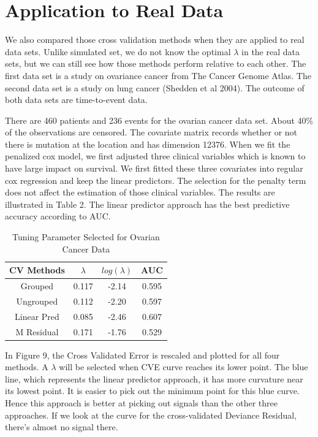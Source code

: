\documentclass{article}\usepackage[]{graphicx}\usepackage[]{color}
\begin{document}
    
    
\section{Application to Real Data}

We also compared those cross validation methods when they are applied to real data sets. Unlike simulated set, we do not know the optimal $\lambda$ in the real data sets, but we can still see how those methods perform relative to each other. The first data set is a study on ovariance cancer from The Cancer Genome Atlas. The second data set is a study on lung cancer (Shedden et al 2004). The outcome of both data sets are time-to-event data.

There are 460 patients and 236 events for the ovarian cancer data set. About 40$\%$ of the observations are censored. The covariate matrix records whether or not there is mutation at the location and has dimension 12376. When we fit the penalized cox model, we first adjusted three clinical variables which is known to have large impact on survival. We first fitted these three covariates into regular cox regression and keep the linear predictors. The selection for the penalty term does not affect the estimation of those clinical variables. The results are illustrated in Table 2. The linear predictor approach has the best predictive accuracy according to AUC. 

\begin{table}[h]
\centering
  \begin{tabular}{ c | c | c | c}
				CV Methods & $\lambda$ & $log(\lambda)$ &AUC \\
				\hline \hline
				Grouped  &  0.117 & -2.14 &   0.595\\
				Ungrouped &  0.112 & -2.20 &  0.597\\
				Linear Pred &  0.085 & -2.46 &     0.607\\
				M Residual & 0.171 & -1.76 & 0.529 
	\end{tabular}
  \caption{Tuning Parameter Selected for Ovarian Cancer Data}
\end{table}


In Figure 9, the Cross Validated Error is rescaled and plotted for all four methods. A $\lambda$ will be selected when CVE curve reaches its lower point. The blue line, which represents the linear predictor approach, it has more curvature near its lowest point. It is easier to pick out the minimum point for this blue curve. Hence this approach is better at picking out signals than the other three approaches. If we look at the curve for the cross-validated Deviance Residual, there's almost no signal there.
\end{document}
